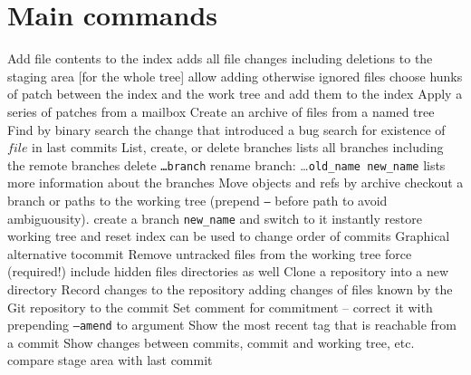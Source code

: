 
\def\content{\uppercase{git}}
\def\shortcontent{\content}
\def\versionnumber{1.2}  %
\def\version{v\versionnumber\ \month\ \year}


\mytitle

\shortintro

\section{Main commands}{}
	{Add file contents to the index}
	{adds all file changes including deletions to the staging area [for the whole tree]}
	{allow adding otherwise ignored files}
	{choose hunks of patch between the index and the work tree and add them to the index}
	{Apply a series of patches from a mailbox}
	{Create an archive of files from a named tree}
	{Find by binary search the change that introduced a bug}
	{search for existence of $file$ in last commits}
	{List, create, or delete branches}
	{lists all branches including the remote branches}
	{delete {\tt \dots branch}}
	{rename branch: \dots {\tt old\_name new\_name}}
	{lists more information about the branches}
	{Move objects and refs by archive}
	{checkout a branch or paths to the working tree (prepend {\tt --} before path to avoid ambiguousity).}
	{create a branch {\tt new\_name} and switch to it instantly}
	{restore working tree and reset index}
	{can be used to change order of commits}
	{Graphical alternative tocommit}
	{Remove untracked files from the working tree}
	{force (required!)}
	{include hidden files}
	{directories as well}
	{Clone a repository into a new directory}
	{Record changes to the repository}
	{adding changes of files known by the Git repository to the commit}
	{Set comment for commitment -- correct it with prepending {\tt --amend} to argument}
	{Show the most recent tag that is reachable from a commit}
	{Show changes between commits, commit and working tree, etc.}
	{compare stage area with last commit}
